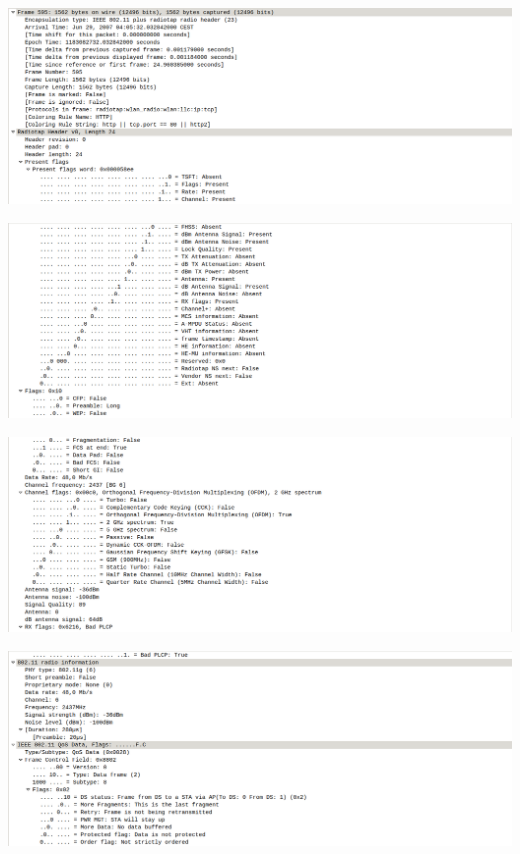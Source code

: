 \documentclass{article}
\begin{document}
\begin{center}
\includegraphics[scale=0.3]{WLAN/tcpres1.png}
\end{center}
\begin{center}
\includegraphics[scale=0.3]{WLAN/tcpres2.png}
\end{center}
\begin{center}
\includegraphics[scale=0.3]{WLAN/tcpres3.png}
\end{center}
\begin{center}
\includegraphics[scale=0.3]{WLAN/tcpres5.png}
\end{center}
\end{document}
